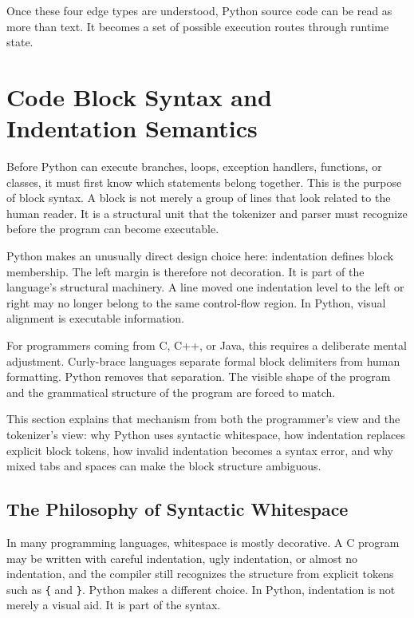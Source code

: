 \documentclass[a4paper,twoside]{report}
\begin{document}
Once these four edge types are understood, Python source code can be read as more than text. It becomes a set of possible execution routes through runtime state.

\section{Code Block Syntax and Indentation Semantics}

Before Python can execute branches, loops, exception handlers, functions, or classes, it must first know which statements belong together. This is the purpose of block syntax. A block is not merely a group of lines that look related to the human reader. It is a structural unit that the tokenizer and parser must recognize before the program can become executable.

Python makes an unusually direct design choice here: indentation defines block membership. The left margin is therefore not decoration. It is part of the language's structural machinery. A line moved one indentation level to the left or right may no longer belong to the same control-flow region. In Python, visual alignment is executable information.

For programmers coming from C, C++, or Java, this requires a deliberate mental adjustment. Curly-brace languages separate formal block delimiters from human formatting. Python removes that separation. The visible shape of the program and the grammatical structure of the program are forced to match.

This section explains that mechanism from both the programmer's view and the tokenizer's view: why Python uses syntactic whitespace, how indentation replaces explicit block tokens, how invalid indentation becomes a syntax error, and why mixed tabs and spaces can make the block structure ambiguous.

\subsection{The Philosophy of Syntactic Whitespace}

In many programming languages, whitespace is mostly decorative. A C program may be written with careful indentation, ugly indentation, or almost no indentation, and the compiler still recognizes the structure from explicit tokens such as \texttt{\{} and \texttt{\}}. Python makes a different choice. In Python, indentation is not merely a visual aid. It is part of the syntax.
\end{document}
